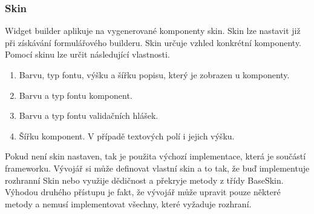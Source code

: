 \subsubsection{Skin}
Widget builder aplikuje na vygenerované komponenty skin. Skin lze nastavit již při získávání formulářového builderu. Skin určuje vzhled konkrétní komponenty. Pomocí skinu lze určit následující vlastnosti.
\begin{enumerate}
\item Barvu, typ fontu, výšku a šířku popisu, který je zobrazen u komponenty.
\item Barvu a typ fontu komponent.
\item Barvu a typ fontu validačních hlášek.
\item Šířku komponent. V případě textových polí i jejich výšku.
\end{enumerate}
Pokud není skin nastaven, tak je použita výchozí implementace, která je součástí frameworku. Vývojář si může definovat vlastní skin a to tak, že buď implementuje rozhranní Skin nebo využije dědičnost a překryje metody z třídy BaseSkin. Výhodou druhého přístupu je fakt, že vývojář může upravit pouze některé metody a nemusí implementovat všechny, které vyžaduje rozhraní.
